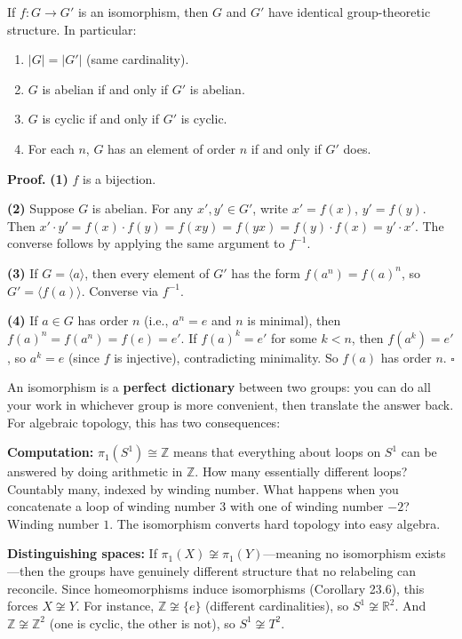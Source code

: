 \documentclass[11pt]{report}
\renewenvironment{proof}[1][Proof]{\noindent\textbf{#1.} }{\hfill$\square$\par\vspace{5pt}}
\begin{document}
\begin{thmbox}
If $f: G \to G'$ is an isomorphism, then $G$ and $G'$ have identical group-theoretic structure. In particular:
\begin{enumerate}
    \item $|G| = |G'|$ (same cardinality).
    \item $G$ is abelian if and only if $G'$ is abelian.
    \item $G$ is cyclic if and only if $G'$ is cyclic.
    \item For each $n$, $G$ has an element of order $n$ if and only if $G'$ does.
\end{enumerate}
\end{thmbox}

\begin{proof}
\textbf{(1)} $f$ is a bijection.

\textbf{(2)} Suppose $G$ is abelian. For any $x', y' \in G'$, write $x' = f(x)$, $y' = f(y)$. Then $x' \cdot y' = f(x) \cdot f(y) = f(xy) = f(yx) = f(y) \cdot f(x) = y' \cdot x'$. The converse follows by applying the same argument to $f^{-1}$.

\textbf{(3)} If $G = \langle a \rangle$, then every element of $G'$ has the form $f(a^n) = f(a)^n$, so $G' = \langle f(a) \rangle$. Converse via $f^{-1}$.

\textbf{(4)} If $a \in G$ has order $n$ (i.e., $a^n = e$ and $n$ is minimal), then $f(a)^n = f(a^n) = f(e) = e'$. If $f(a)^k = e'$ for some $k < n$, then $f(a^k) = e'$, so $a^k = e$ (since $f$ is injective), contradicting minimality. So $f(a)$ has order $n$.
\end{proof}

\begin{rembox}
An isomorphism is a \textbf{perfect dictionary} between two groups: you can do all your work in whichever group is more convenient, then translate the answer back. For algebraic topology, this has two consequences:

\textbf{Computation:} $\pi_1(S^1) \cong \mathbb{Z}$ means that everything about loops on $S^1$ can be answered by doing arithmetic in $\mathbb{Z}$. How many essentially different loops? Countably many, indexed by winding number. What happens when you concatenate a loop of winding number $3$ with one of winding number $-2$? Winding number $1$. The isomorphism converts hard topology into easy algebra.

\textbf{Distinguishing spaces:} If $\pi_1(X) \not\cong \pi_1(Y)$---meaning no isomorphism exists---then the groups have genuinely different structure that no relabeling can reconcile. Since homeomorphisms induce isomorphisms (Corollary 23.6), this forces $X \not\cong Y$. For instance, $\mathbb{Z} \not\cong \{e\}$ (different cardinalities), so $S^1 \not\cong \mathbb{R}^2$. And $\mathbb{Z} \not\cong \mathbb{Z}^2$ (one is cyclic, the other is not), so $S^1 \not\cong T^2$.
\end{rembox}
\end{document}
